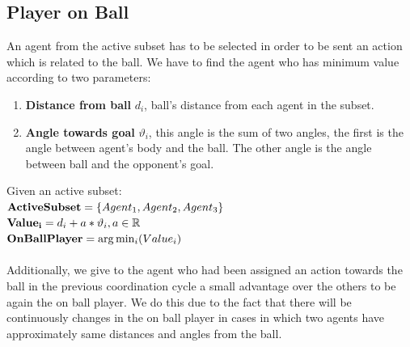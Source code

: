\subsection{Player on Ball}
An agent from the active subset has to be selected in order to be sent an action which is related to the ball. We have to find the agent who has minimum value according to two parameters:
\begin{enumerate}
\item \textbf{Distance from ball} $d_{i}$, ball's distance from each agent in the subset. 
\item \textbf{Angle towards goal} $\vartheta_{i}$, this angle is the sum of two angles, the first is the angle between agent's body and the ball. The other angle is the angle between ball and the opponent's goal.
\end{enumerate}
Given an active subset:\\
${\bf ActiveSubset} = \lbrace Agent_{1},Agent_{2},Agent_{3} \rbrace $\\
${\bf Value_{i}} = d_{i} + a \ast \vartheta_{i}, a\in\mathbb{R}$\\
${\bf OnBallPlayer} = \arg\min_{i}(Value_{i}) $\\
\\Additionally, we give to the agent who had been assigned an action towards the ball in the previous coordination cycle a small
advantage over the others to be again the on ball player. We do this due to the fact that there will be continuously changes in the on ball player in cases in which two agents have approximately same distances and angles from the ball.
